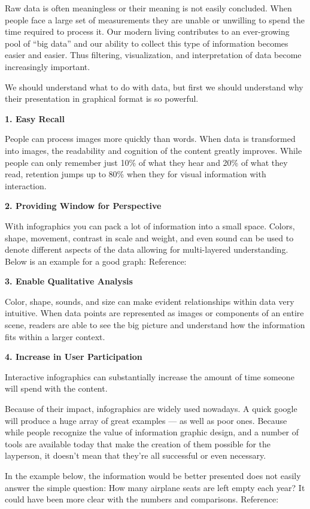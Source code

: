 \documentclass[]{book}
\theoremstyle{definition}
\theoremstyle{definition}
\theoremstyle{definition}
\theoremstyle{remark}
\begin{document}
Raw data is often meaningless or their meaning is not easily concluded.
When people face a large set of measurements they are unable or
unwilling to spend the time required to process it. Our modern living
contributes to an ever-growing pool of ``big data'' and our ability to
collect this type of information becomes easier and easier. Thus
filtering, visualization, and interpretation of data become increasingly
important.

We should understand what to do with data, but first we should
understand why their presentation in graphical format is so powerful.

\textbf{1. Easy Recall}

People can process images more quickly than words. When data is
transformed into images, the readability and cognition of the content
greatly improves. While people can only remember just 10\% of what they
hear and 20\% of what they read, retention jumps up to 80\% when they
for visual information with interaction.

\textbf{2. Providing Window for Perspective}

With infographics you can pack a lot of information into a small space.
Colors, shape, movement, contrast in scale and weight, and even sound
can be used to denote different aspects of the data allowing for
multi-layered understanding. Below is an example for a good graph:
Reference: \citep{image_good}

\textbf{3. Enable Qualitative Analysis}

Color, shape, sounds, and size can make evident relationships within
data very intuitive. When data points are represented as images or
components of an entire scene, readers are able to see the big picture
and understand how the information fits within a larger context.

\textbf{4. Increase in User Participation}

Interactive infographics can substantially increase the amount of time
someone will spend with the content.

Because of their impact, infographics are widely used nowadays. A quick
google will produce a huge array of great examples --- as well as poor
ones. Because while people recognize the value of information graphic
design, and a number of tools are available today that make the creation
of them possible for the layperson, it doesn't mean that they're all
successful or even necessary.

In the example below, the information would be better presented does not
easily answer the simple question: How many airplane seats are left
empty each year? It could have been more clear with the numbers and
comparisons. Reference: \citep{image_bad}
\end{document}
